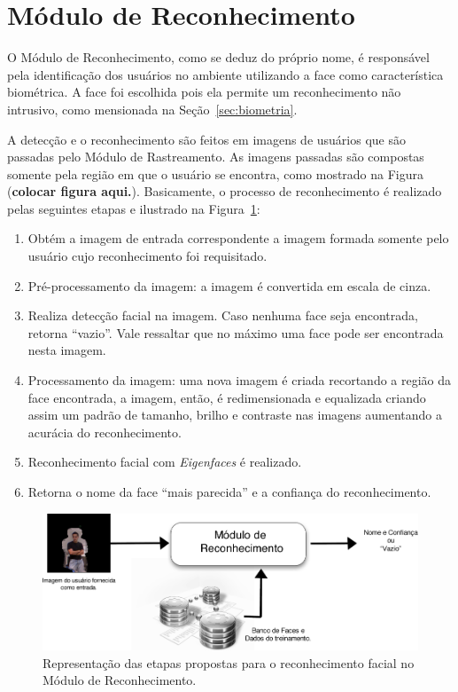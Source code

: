 \section{Módulo de Reconhecimento}

	O Módulo de Reconhecimento, como se deduz do próprio nome, é responsável pela
	identificação dos usuários no ambiente utilizando a face como característica
	biométrica. A face foi escolhida pois ela permite um reconhecimento não
	intrusivo, como mensionada na Seção~\ref{sec:biometria}.

	A detecção e o reconhecimento são feitos em imagens de usuários que são
	passadas pelo Módulo de Rastreamento. As imagens passadas são compostas somente
	pela região em que o usuário se encontra, como mostrado na Figura
	(\textbf{colocar figura aqui.}). Basicamente, o processo de reconhecimento é
	realizado pelas seguintes etapas e ilustrado na
	Figura~\ref{fig:processo-reconhecimento}:

		\begin{enumerate}
			\item Obtém a imagem de entrada correspondente a imagem formada somente pelo usuário cujo reconhecimento foi requisitado.
			\item Pré-processamento da imagem: a imagem é convertida em escala de cinza.
			\item Realiza detecção facial na imagem. Caso nenhuma face seja encontrada, retorna ``vazio''. Vale ressaltar que no máximo uma face pode ser encontrada nesta imagem.
			\item Processamento da imagem: uma nova imagem é criada recortando a região da face encontrada, a imagem, então, é redimensionada e equalizada criando assim um padrão de tamanho, brilho e contraste nas imagens aumentando a acurácia do reconhecimento.
			\item Reconhecimento facial com \textit{Eigenfaces} é realizado.
			\item Retorna o nome da face ``mais parecida'' e a confiança do reconhecimento.
		\end{enumerate}

		\begin{figure}[hbt]
			\begin{center}
				\includegraphics[scale=2.0]{figuras/4.ProblemaEProposta/reconhecimento-simples.png}
			\end{center}
			\caption{Representação das etapas propostas para o reconhecimento facial no Módulo de Reconhecimento.}
			\label{fig:processo-reconhecimento}
		\end{figure}

